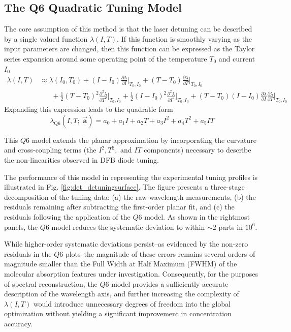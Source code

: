 \documentclass[8pt,a4paper]{report}
\begin{document}
	\subsection{The Q6 Quadratic Tuning Model}
	The core assumption of this method is that the laser detuning can be described by a single valued function $\lambda(I, T)$. If this function is smoothly varying as the input parameters are changed, then this function can be expressed as the Taylor series expansion around some operating point of the temperature $T_0$ and current $I_0$
	\begin{align} \label{det_taylor}
		\lambda (I, T) &\approx \lambda(I_0, T_0) + (I-I_0) \frac{\partial \lambda}{\partial I} \Bigg|_{T_0,I_0} + (T-T_0)\frac{\partial \lambda}{\partial T}\Bigg|_{T_0,I_0}
		\nonumber\\&\;\;\;\;\;\; + \frac{1}{2} (T-T_0)^2 \frac{\partial^2 \lambda}{\partial T ^2}\Bigg|_{T_0,I_0}  + \frac{1}{2}(I-I_0)^2\frac{\partial^2 \lambda}{\partial I ^2}\Bigg|_{T_0,I_0} + (T-T_0)(I-I_0)\frac{\partial \lambda}{\partial I} \frac{\partial \lambda}{\partial T}\Bigg|_{T_0,I_0} 
	\end{align}
	Expanding this expression leads to the quadratic form
	\begin{equation} \label{det_quadratic}
		\lambda_\mathrm{Q6}(I, T;\; \vec{\mathbf{a}}) = a_0 + a_1 I + a_2 T + a_3 I^2 + a_4 T^2 + a_5 IT
	\end{equation}
	
	This $Q6$ model extends the planar approximation by incorporating the curvature and cross-coupling terms (the $I^2, T^2,$ and $IT$ components) necessary to describe the non-linearities observed in DFB diode tuning.
	
	The performance of this model in representing the experimental tuning profiles is illustrated in Fig. \ref{fig:det_detuningsurface}. The figure presents a three-stage decomposition of the tuning data: (a) the raw wavelength measurements, (b) the residuals remaining after subtracting the first-order planar fit, and (c) the residuals following the application of the $Q6$ model. As shown in the rightmost panels, the $Q6$ model reduces the systematic deviation to within $\sim 2$ parts in $10^6$.
	
	While higher-order systematic deviations persist--as evidenced by the non-zero residuals in the $Q6$ plots--the magnitude of these errors remains several orders of magnitude smaller than the Full Width at Half Maximum (FWHM) of the molecular absorption features under investigation. Consequently, for the purposes of spectral reconstruction, the $Q6$ model provides a sufficiently accurate description of the wavelength axis, and further increasing the complexity of $\lambda(I, T)$ would introduce unnecessary degrees of freedom into the global optimization without yielding a significant improvement in concentration accuracy.
	
\end{document}

